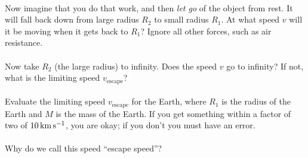 \documentclass[12pt]{article}
\begin{document}
\paragraph{\theproblem}%
Now imagine that you do that work, and then \emph{let go} of the
object from rest.  It will fall back down from large radius $R_2$ to
small radius $R_1$.  At what speed $v$ will it be moving when it gets
back to $R_1$?  Ignore all other forces, such as air resistance.

\paragraph{\theproblem}%
Now take $R_2$ (the large radius) to infinity.  Does the speed $v$ go
to infinity?  If not, what is the limiting speed $v_\mathrm{escape}$?

\paragraph{\theproblem}%
Evaluate the limiting speed $v_\mathrm{escape}$ for the Earth, where
$R_1$ is the radius of the Earth and $M$ is the mass of the Earth.  If
you get something within a factor of two of $10\,\mathrm{km}\,\mathrm{s}^{-1}$, you
are okay; if you don't you must have an error.

\paragraph{\theproblem}%
Why do we call this speed ``escape speed''?
\end{document}
